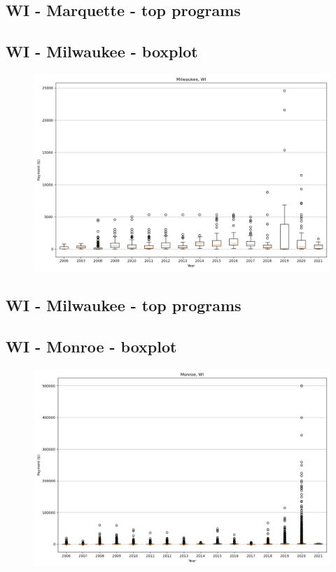 \subsection*{WI - Marquette - top programs}

\newpage
\subsection*{WI - Milwaukee - boxplot}
\begin{figure}[h]
\centering
\includegraphics[width=7in]{../output/boxplots/counties/Milwaukee-WI_boxplot.png}
\end{figure}


\subsection*{WI - Milwaukee - top programs}

\newpage
\subsection*{WI - Monroe - boxplot}
\begin{figure}[h]
\centering
\includegraphics[width=7in]{../output/boxplots/counties/Monroe-WI_boxplot.png}
\end{figure}


